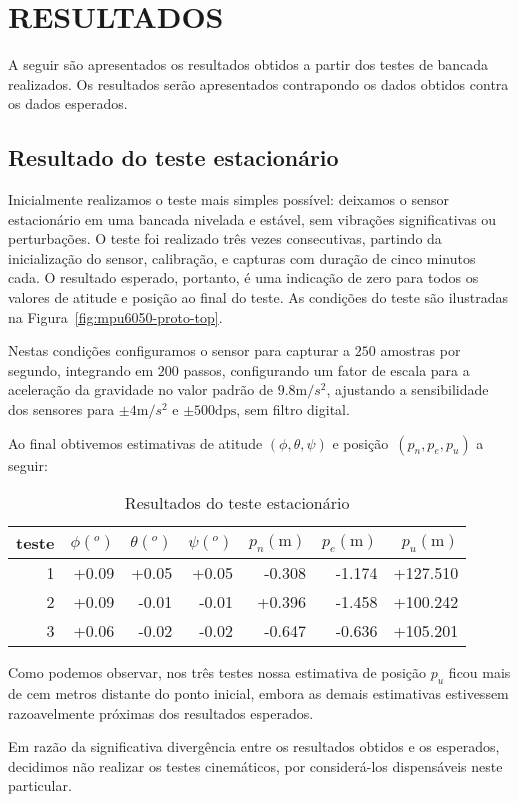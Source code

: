 \chapter{RESULTADOS}\label{chap:resuldatos}

A seguir são apresentados os resultados obtidos a partir dos testes de bancada realizados. Os resultados serão apresentados contrapondo os dados obtidos contra os dados esperados.

\section{Resultado do teste estacionário}

Inicialmente realizamos o teste mais simples possível: deixamos o sensor estacionário em uma bancada nivelada e estável, sem vibrações significativas ou perturbações. O teste foi realizado três vezes consecutivas, partindo da inicialização do sensor, calibração, e capturas com duração de cinco minutos cada. O resultado esperado, portanto, é uma indicação de zero para todos os valores de atitude e posição ao final do teste. As condições do teste são ilustradas na Figura~\ref{fig:mpu6050-proto-top}.

Nestas condições configuramos o sensor para capturar a \(250\) amostras por segundo, integrando em \(200\) passos, configurando um fator de escala para a aceleração da gravidade no valor padrão de \(9.8\textrm{m}/{s}^{2}\), ajustando a sensibilidade dos sensores para \(\pm 4\textrm{m}/{s}^{2}\) e \(\pm 500\textrm{dps}\), sem filtro digital.

Ao final obtivemos estimativas de atitude \((\phi,\theta,\psi)\) e posição~\((p_{n},p_{e},p_{u})\) a seguir:

\begin{table}[ht]
    \caption{Resultados do teste estacionário}
    \centering
    \begin{tabular}{r r r r r r r}
        teste & \(\phi (^{o})\) & \(\theta(^{o})\) & \(\psi(^{o})\) & \(p_{n}(\textrm{m})\) & \(p_{e}(\textrm{m})\) & \(p_{u}(\textrm{m})\)  \\
        \toprule
        1 & +0.09 & +0.05 & +0.05 & -0.308 & -1.174 & +127.510  \\
        2 & +0.09 & -0.01 & -0.01 & +0.396 & -1.458 & +100.242  \\
        3 & +0.06 & -0.02 & -0.02 & -0.647 & -0.636 & +105.201  \\
        \bottomrule
    \end{tabular}
    \label{Tab:tabela1}
\end{table}

Como podemos observar, nos três testes nossa estimativa de posição \(p_{u}\) ficou mais de cem metros distante do ponto inicial, embora as demais estimativas estivessem razoavelmente próximas dos resultados esperados.

Em razão da significativa divergência entre os resultados obtidos e os esperados, decidimos não realizar os testes cinemáticos, por considerá-los dispensáveis neste particular.
